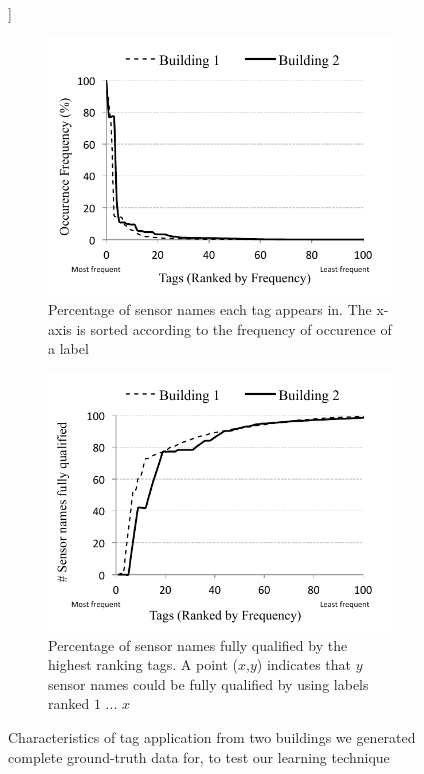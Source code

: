 \begin{figure}[h!]]
\centering
	\begin{subfigure}{0.40\textwidth}
                \centering
		\includegraphics[width=\textwidth]{./figs/pointOccuranceFreq.pdf}
                \caption{Percentage of sensor names each tag appears in. The x-axis is sorted according to the frequency of occurence of a label}
                \label{fig:labelFreq}
	\end{subfigure}
	\begin{subfigure}{0.40\textwidth}
                \centering
		\includegraphics[width=\textwidth]{./figs/pointCDF.pdf}
                \caption{Percentage of sensor names fully qualified by the highest ranking tags. A point ($x$,$y$) indicates that $y$ sensor names could be fully qualified by using labels ranked $1$ ... $x$}
                \label{fig:pointCDF}
	\end{subfigure}
\caption{Characteristics of tag application from two buildings we generated complete ground-truth data for, to test our learning technique}
\label{fig:buildingLabelCharacteristics}
\end{figure}


